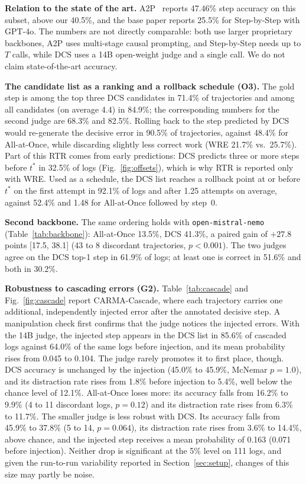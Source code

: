 \documentclass[conference]{IEEEtran}
\begin{document}


\textbf{Relation to the state of the art.} A2P~\cite{west2025a2p} reports 47.46\% step accuracy on this subset, above our 40.5\%, and the base paper reports 25.5\% for Step-by-Step with GPT-4o. The numbers are not directly comparable: both use larger proprietary backbones, A2P uses multi-stage causal prompting, and Step-by-Step needs up to $T$ calls, while DCS uses a 14B open-weight judge and a single call. We do not claim state-of-the-art accuracy.

\textbf{The candidate list as a ranking and a rollback schedule (O3).} The gold step is among the top three DCS candidates in 71.4\% of trajectories and among all candidates (on average 4.4) in 84.9\%; the corresponding numbers for the second judge are 68.3\% and 82.5\%. Rolling back to the step predicted by DCS would re-generate the decisive error in 90.5\% of trajectories, against 48.4\% for All-at-Once, while discarding slightly less correct work (WRE 21.7\% vs.\ 25.7\%). Part of this RTR comes from early predictions: DCS predicts three or more steps before $t^*$ in 32.5\% of logs (Fig.~\ref{fig:offsets}), which is why RTR is reported only with WRE. Used as a schedule, the DCS list reaches a rollback point at or before $t^*$ on the first attempt in 92.1\% of logs and after 1.25 attempts on average, against 52.4\% and 1.48 for All-at-Once followed by step~0.

\textbf{Second backbone.} The same ordering holds with \texttt{open-mistral-nemo} (Table~\ref{tab:backbone}): All-at-Once 13.5\%, DCS 41.3\%, a paired gain of $+27.8$ points [17.5, 38.1] (43 to 8 discordant trajectories, $p<0.001$). The two judges agree on the DCS top-1 step in 61.9\% of logs; at least one is correct in 51.6\% and both in 30.2\%.



\textbf{Robustness to cascading errors (G2).} Table~\ref{tab:cascade} and Fig.~\ref{fig:cascade} report CARMA-Cascade, where each trajectory carries one additional, independently injected error after the annotated decisive step. A manipulation check first confirms that the judge notices the injected errors. With the 14B judge, the injected step appears in the DCS list in 85.6\% of cascaded logs against 64.0\% of the same logs before injection, and its mean probability rises from 0.045 to 0.104. The judge rarely promotes it to first place, though. DCS accuracy is unchanged by the injection (45.0\% to 45.9\%, McNemar $p=1.0$), and its distraction rate rises from 1.8\% before injection to 5.4\%, well below the chance level of 12.1\%. All-at-Once loses more: its accuracy falls from 16.2\% to 9.9\% (4 to 11 discordant logs, $p=0.12$) and its distraction rate rises from 6.3\% to 11.7\%. The smaller judge is less robust with DCS. Its accuracy falls from 45.9\% to 37.8\% (5 to 14, $p=0.064$), its distraction rate rises from 3.6\% to 14.4\%, above chance, and the injected step receives a mean probability of 0.163 (0.071 before injection). Neither drop is significant at the 5\% level on 111 logs, and given the run-to-run variability reported in Section~\ref{sec:setup}, changes of this size may partly be noise.
\end{document}
